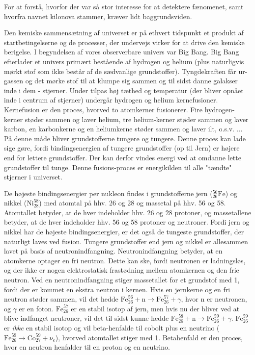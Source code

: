 \documentclass[twocolumn]{article}
\begin{document}
For at forstå, hvorfor der var så stor interesse for at detektere fænomenet, samt hvorfra navnet kilonova stammer, kræver lidt baggrundsviden. 

Den kemiske sammensætning af universet er på ethvert tidspunkt et produkt af startbetingelserne og de processer, der undervejs virker for at drive den kemiske berigelse. I begyndelsen af vores observerbare univers var Big Bang. Big Bang efterlader et univers primært bestående af hydrogen og helium (plus naturligvis mørkt stof som ikke består af de sædvanlige grundstoffer). Tyngdekraften får ur-gassen og det mørke stof til at klumpe sig sammen og til sidst danne galakser inde i dem - stjerner. Under tilpas høj tæthed og temperatur (der bliver opnået inde i centrum af  stjerner) undergår hydrogen og helium kernefusioner. Kernefusion er den proces, hvorved to atomkerner fusionerer. Fire hydrogen-kerner støder sammen og laver helium, tre helium-kerner støder sammen og laver karbon, en karbonkerne og en heliumkerne støder sammen og laver ilt, o.s.v. ... På denne måde bliver grundstofferne tungere og tungere. Denne proces kan lade sige gøre, fordi bindingsenergien af tungere grundstoffer (op til Jern) er højere end for lettere grundstoffer. Der kan derfor vindes energi ved at omdanne lette grundstoffer til tunge. Denne fusions-proces er energikilden til alle "tændte" stjerner i universet. 


De højeste bindingsenergier per nukleon findes i grundstofferne jern ($_{26}^{56}\mathrm{Fe}$) og nikkel ($\mathrm{Ni}_{28}^{58}$) med atomtal på hhv. 26 og 28 og massetal på hhv. 56 og 58. Atomtallet betyder, at de hver indeholder hhv. 26 og 28 protoner, og massetallene betyder, at de hver indeholder hhv. 56 og 58 protoner og neutroner. Fordi jern og nikkel har de højeste bindingsenergier, er det også de tungeste grundstoffer, der naturligt laves ved fusion. Tungere grundstoffer end jern og nikkel er allesammen lavet på basis af neutronindfangning. Neutronindfangning betyder, at en atomkerne optager en fri neutron. Dette kan ske, fordi neutronen er ladningsløs, og der ikke er nogen elektrostatisk frastødning mellem atomkernen og den frie neutron. Ved en neutronindfangning stiger massetallet for et grundstof med 1, fordi der er kommet en ekstra neutron i kernen. Hvis en jernkerne og en fri neutron støder sammen, vil det hedde $\mathrm{Fe}_{26}^{56} + \mathrm{n} \rightarrow \mathrm{Fe}_{26}^{57} + \gamma$, hvor n er neutronen, og $\gamma$ er en foton. $\mathrm{Fe}_{26}^{57}$ er en stabil isotop af jern, men hvis nu der bliver ved at blive indfanget neutroner, vil det til sidst kunne hedde $\mathrm{Fe}_{26}^{58} + \mathrm{n} \rightarrow \mathrm{Fe}_{26}^{59} + \gamma$. $\mathrm{Fe}_{26}^{59}$ er \textit{ikke} en stabil isotop og vil beta-henfalde til cobolt plus en neutrino ( $\mathrm{Fe}_{26}^{59} \rightarrow  \mathrm{Co}_{27}^{59} + \nu_e$), hvorved atomtallet stiger med 1. Betahenfald er den proces, hvor en neutron henfalder til en proton og en neutrino.
\end{document}
